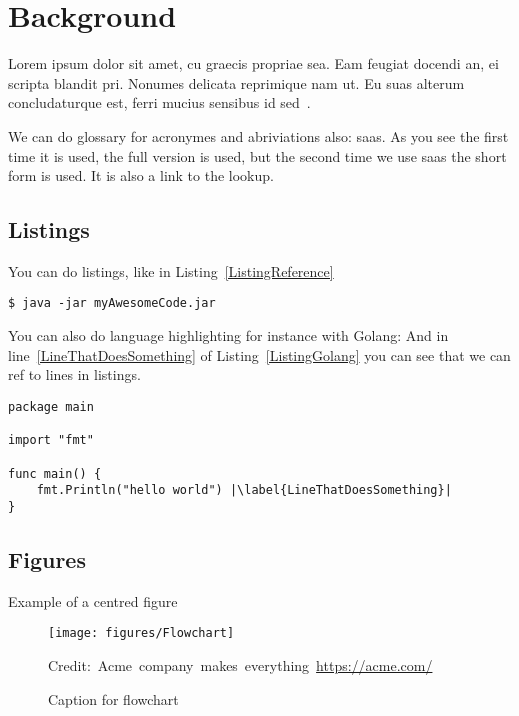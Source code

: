 \section{Background}

Lorem ipsum dolor sit amet, cu graecis propriae sea. Eam feugiat docendi an, ei scripta blandit pri. Nonumes delicata reprimique nam ut. Eu suas alterum concludaturque est, ferri mucius sensibus id sed~\cite{raftAlg}.

We can do glossary for acronymes and abriviations also: \gls{saas}. As you see the first time it is used, the full version is used, but the second time we use \gls{saas} the short form is used. It is also a link to the lookup.


\subsection{Listings}
You can do listings, like in Listing~\ref{ListingReference}
\begin{lstlisting}[caption={[Short caption]Look at this cool listing. Find the rest in Appendix~\ref{Listing}},label=ListingReference]
$ java -jar myAwesomeCode.jar
\end{lstlisting}

You can also do language highlighting for instance with Golang:
And in line~\ref{LineThatDoesSomething} of Listing~\ref{ListingGolang} you can see that we can ref to lines in listings.

\begin{lstlisting}[caption={Hello world in Golang},label=ListingGolang,escapechar=|]
package main

import "fmt"

func main() {
    fmt.Println("hello world") |\label{LineThatDoesSomething}|
}

\end{lstlisting}

\subsection{Figures}

Example of a centred figure
\begin{figure}[H]
    \centering
    \texttt{[image: figures/Flowchart]}
    \caption{Caption for flowchart}
  	\medskip 
	\hspace*{15pt}\hbox{\scriptsize Credit: Acme company makes everything \url{https://acme.com/}}
    \label{FlowchartFigure}
\end{figure}

